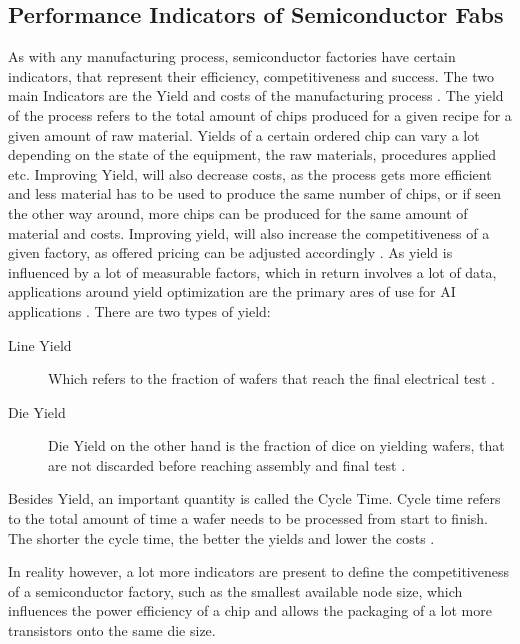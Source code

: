 \documentclass{Academic}
\begin{document}
    \subsection{Performance Indicators of Semiconductor Fabs}
    As with any manufacturing process, semiconductor factories have certain indicators, that represent their efficiency, competitiveness and success. The two main Indicators are the Yield and costs of the manufacturing process \cite{yuan-fu_deep_2019-1,batool_systematic_2021,noauthor_machine_nodate}. The yield of the process refers to the total amount of chips produced for a given recipe for a given amount of raw material. Yields of a certain ordered chip can vary a lot depending on the state of the equipment, the raw materials, procedures applied etc. Improving Yield, will also decrease costs, as the process gets more efficient and less material has to be used to produce the same number of chips, or if seen the other way around, more chips can be produced for the same amount of material and costs. Improving yield, will also increase the competitiveness of a given factory, as offered pricing can be adjusted accordingly \cite{batool_systematic_2021}. As yield is influenced by a lot of measurable factors, which in return involves a lot of data, applications around yield optimization are the primary ares of use for AI applications \cite{jiang_novel_2020}. There are two types of yield:
    \begin{description}
        \item[Line Yield] Which refers to the fraction of wafers that reach the final electrical test \cite{noauthor_machine_nodate}.
        \item[Die Yield] Die Yield on the other hand is the fraction of dice on yielding wafers, that are not discarded before reaching assembly and final test \cite{noauthor_machine_nodate}. 
    \end{description}
    Besides Yield, an important quantity is called the Cycle Time. Cycle time refers to the total amount of time a wafer needs to be processed from start to finish. The shorter the cycle time, the better the yields and lower the costs \cite{wang_fuzzy_2021}.

    In reality however, a lot more indicators are present to define the competitiveness of a semiconductor factory, such as the smallest available node size, which influences the power efficiency of a chip and allows the packaging of a lot more transistors onto the same die size.
\end{document}
